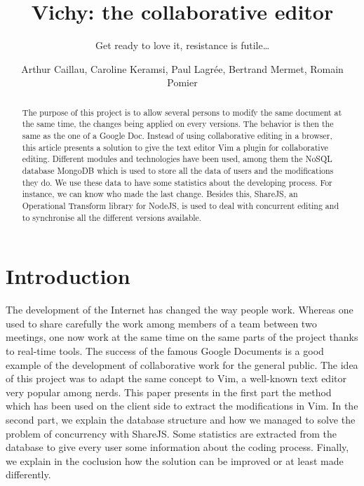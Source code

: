 \documentclass{llncs}
\begin{document}
\title{Vichy: the collaborative editor}
\subtitle{Get ready to love it, resistance is futile\ldots}

\author{Arthur Caillau, Caroline Keramsi, Paul Lagrée, Bertrand Mermet, Romain Pomier}

\maketitle

\begin{abstract}

The purpose of this project is to allow several persons to modify the same document at the same time, the changes being applied on every versions. The behavior is then the same as the one of a Google Doc. Instead of using collaborative editing in a browser, this article presents a solution to give the text editor Vim a plugin for collaborative editing. Different modules and technologies have been used, among them the NoSQL database MongoDB which is used to store all the data of users and the
modifications they do. We use these data to have some statistics about the developing process. For instance, we can know who made the last change. Besides this, ShareJS, an Operational Transform library for NodeJS, is used to deal with concurrent editing and to synchronise all the different versions available.

\end{abstract}

\section{Introduction}\label{sec:Introduction}

The development of the Internet has changed the way people work. Whereas one used to share carefully the work among members of a team between two meetings, one now work at the same time on the same parts of the project thanks to real-time tools. The success of the famous Google Documents is a good example of the development of collaborative work for the general public. The idea of this project was to adapt the same concept to Vim, a well-known text editor very popular among nerds. This paper
presents in the first part the method which has been used on the client side to extract the modifications in Vim. In the second part, we explain the database structure and how we managed to solve the problem of concurrency with ShareJS. Some statistics are extracted from the database to give every user some information about the coding process. Finally, we explain in the coclusion how the solution can be improved or at least made differently.
\end{document}
